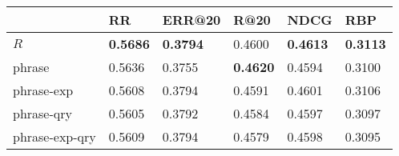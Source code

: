 \begin{tabular}{llllll}
\toprule
{} &               RR &           ERR@20 &             R@20 &             NDCG &              RBP \\
\midrule
$R$            &  \textbf{0.5686} &  \textbf{0.3794} &             0.4600 &  \textbf{0.4613} &  \textbf{0.3113} \\
phrase         &           0.5636 &           0.3755 &  \textbf{0.4620} &           0.4594 &           0.3100 \\
phrase-exp     &           0.5608 &           0.3794 &           0.4591 &           0.4601 &           0.3106 \\
phrase-qry     &           0.5605 &           0.3792 &           0.4584 &           0.4597 &           0.3097 \\
phrase-exp-qry &           0.5609 &           0.3794 &           0.4579 &           0.4598 &           0.3095 \\
\bottomrule
\end{tabular}
